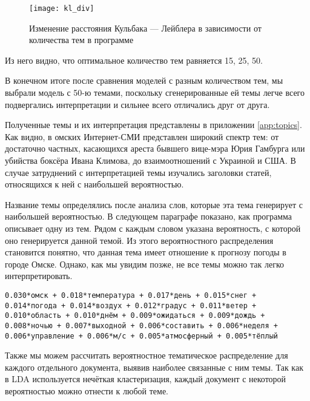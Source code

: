 \begin{figure}
	\centering
    \texttt{[image: kl\_div]}
    \caption{Изменение расстояния Кульбака — Лейблера в зависимости от количества тем в программе}
    \label{fig:kl_div}
\end{figure}

Из него видно, что оптимальное количество тем равняется 15, 25, 50.

В конечном итоге после сравнения моделей с разным количеством тем, мы выбрали модель с 50-ю темами, поскольку сгенерированные ей темы легче всего подвергались интерпретации и сильнее всего отличались друг от друга.

Полученные темы и их интерпретация представлены в приложении \ref{app:topics}. Как видно, в омских Интернет-СМИ представлен широкий спектр тем: от достаточно частных, касающихся ареста бывшего вице-мэра Юрия Гамбурга или убийства боксёра Ивана Климова, до взаимоотношений с Украиной и США. В случае затруднений с интерпретацией темы изучались заголовки статей, относящихся к ней с наибольшей вероятностью.

Название темы определялись после анализа слов, которые эта тема генерирует с наибольшей вероятностью. В следующем параграфе показано, как программа описывает одну из тем. Рядом с каждым словом указана вероятность, с которой оно генерируется данной темой. Из этого вероятностного распределения становится понятно, что данная тема имеет отношение к прогнозу погоды в городе Омске. Однако, как мы увидим позже, не все темы можно так легко интерпретировать.

\texttt{0.030*омск + 0.018*температура + 0.017*день + 0.015*снег + 0.014*погода + 0.014*воздух + 0.012*градус + 0.011*ветер + 0.010*область + 0.010*днём + 0.009*ожидаться + 0.009*дождь + 0.008*ночью + 0.007*выходной + 0.006*составить + 0.006*неделя + 0.006*управление + 0.006*м/с + 0.005*атмосферный + 0.005*тёплый}

Также мы можем рассчитать вероятностное тематическое распределение для каждого отдельного документа, выявив наиболее связанные с ним темы. Так как в LDA используется нечёткая кластеризация, каждый документ с некоторой вероятностью можно отнести к любой теме. %


